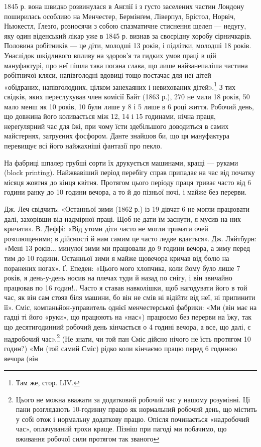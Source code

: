 1845 р. вона швидко розвинулася в Англії і з густо заселених
частин Лондону поширилась особливо на Менчестер, Бермінґем,
Ліверпул, Брістол, Норвіч, Ньюкестл, Ґлезґо, розносячи з
собою спазматичне стиснення щелеп — недугу, яку один віденський
лікар уже в 1845 р. визнав за своєрідну хоробу сірничкарів.
Половина робітників — це діти, молодші 13 років, і
підлітки, молодші 18 років. Унаслідок шкідливого впливу на
здоров’я та гидких умов праці в цій мануфактурі, про неї пішла
така погана слава, що лише найзанепаліша частина робітничої
кляси, напівголодні вдовиці тощо постачає для неї дітей — «обідраних,
напівголодних, цілком занехаяних і невихованих дітей».\footnote{
Там же, стор. LIV.
}
З тих свідків, яких переслухував член комісії Байт (1863 р.),
270 не мали 18 років, 50 мало менш як 10 років, 10 були лише
у 8 і 5 лише в 6 році життя. Робочий день, що довжина його коливається
між 12, 14 і 15 годинами, нічна праця, нереґулярний
час для їжі, при чому їсти здебільшого доводиться в самих майстернях,
затруєних фосфором. Данте знайшов би, що ця мануфактура
перевищує всі його найжахніші фантазії про пекло.

На фабриці шпалер грубші сорти їх друкується машинами,
кращі — руками (block printing). Найжвавіший період перебігу
справ припадає на час від початку місяця жовтня до кінця
квітня. Протягом цього періоду праця триває часто від 6 години
ранку до 10 години вечора, а то й до пізньої ночі, і майже без
перерви.

Дж. Леч свідчить: «Останньої зими (1862 р.) із 19 дівчат 6
не могли працювати далі, захорівши від надмірної праці. Щоб не
дати їм заснути, я мусив на них кричати». В. Деффі: «Від утоми
діти часто не могли тримати очей розплющеними; в дійсності й
нам самим це часто ледве вдається». Дж. Ляйтбурн: «Мені
13 років... минулої зими ми працювали до 9 години вечора, а
зиму перед тим до 10 години. Останньої зими я майже щовечора
кричав від болю на поранених ногах». Ґ. Епеден: «Цього мого
хлопчика, коли йому було лише 7 років, я день-у-день носив
на плечах туди й назад по снігу, і він звичайно працював по
16 годин!.. Часто я ставав навколішки, щоб нагодувати його в той
час, як він сам стояв біля машини, бо він не смів ні відійти від
неї, ні припинити її». Сміс, компаньйон-управитель однієї
менчестерської фабрики: «Ми (він має на гадці ті його «руки»,
що працюють на «нас») працюємо без перерви на їжу, так що
десятигодинний робочий день кінчається о 4  годині вечора, а
все, що далі, є надробочий час».\footnote{
Цього не можна вважати за додатковий робочий час у нашому розумінні.
Ці пани розглядають 10-годинну працю як нормальний
робочий день, що містить у собі отож і нормальну додаткову працю. Опісля
починається «надробочий час», оплачуваний трохи краще. Пізніш при
пагоді ми побачимо, що вживання робочої сили протягом так званого
} (Не знати, чи той пан Сміс
дійсно нічого не їсть протягом  10 годин?) «Ми (той самий
Сміс) рідко коли кінчаємо працю перед 6 годиною вечора (він